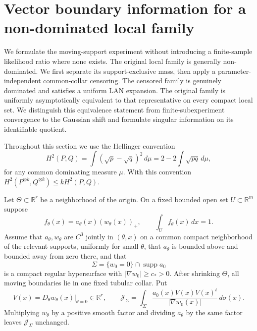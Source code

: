 \section{Vector boundary information for a non-dominated local family}
\label{sec:v22-vector-information}

We formulate the moving-support experiment without introducing a
finite-sample likelihood ratio where none exists.  The original local family
is generally non-dominated.  We first separate its support-exclusive mass,
then apply a parameter-independent common-collar censoring.  The censored
family is genuinely dominated and satisfies a uniform LAN expansion.  The
original family is uniformly asymptotically equivalent to that representative
on every compact local set.  We distinguish this equivalence statement from
finite-subexperiment convergence to the Gaussian shift and formulate singular
information on its identifiable quotient.

Throughout this section we use the Hellinger convention
\begin{equation}\label{eq:v22-hellinger-convention}
 H^2(P,Q)=\int(\sqrt p-\sqrt q)^2\,d\mu
        =2-2\int\sqrt{pq}\,d\mu,
\end{equation}
for any common dominating measure $\mu$.  With this convention
$H^2(P^{\otimes k},Q^{\otimes k})\le kH^2(P,Q)$.

Let $\Theta\subset\mathbb R^r$ be a neighborhood of the origin.  On a fixed
bounded open set $U\subset\mathbb R^m$ suppose
\begin{equation}\label{eq:v22-vector-density}
 f_\theta(x)=a_\theta(x)(w_\theta(x))_+,
 \qquad \int_U f_\theta(x)\,dx=1.
\end{equation}
Assume that $a_\theta,w_\theta$ are $C^3$ jointly in $(\theta,x)$ on a
common compact neighborhood of the relevant supports, uniformly for small
$\theta$, that $a_\theta$ is bounded above and bounded away from zero there,
and that
\[
 \Sigma=\{w_0=0\}\cap\operatorname{supp}a_0
\]
is a compact regular hypersurface with $|\nabla w_0|\ge c_*>0$.  After
shrinking $\Theta$, all moving boundaries lie in one fixed tubular collar.
Put
\begin{equation}\label{eq:v22-boundary-velocity-matrix}
 V(x)=D_\theta w_\theta(x)|_{\theta=0}\in\mathbb R^r,
 \qquad
 \mathcal J_\Sigma=
 \int_\Sigma\frac{a_0(x)V(x)V(x)^t}{|\nabla w_0(x)|}\,d\sigma(x).
\end{equation}
Multiplying $w_\theta$ by a positive smooth factor and dividing
$a_\theta$ by the same factor leaves $\mathcal J_\Sigma$ unchanged.

